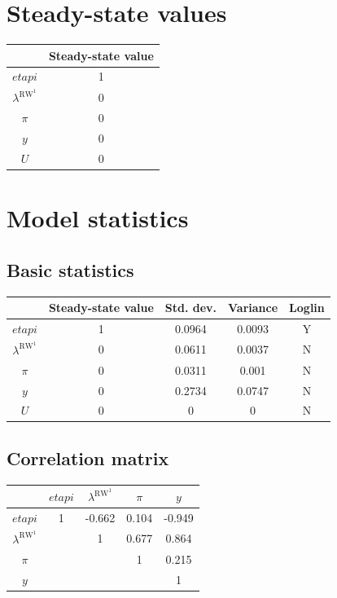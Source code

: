 

\section{Steady-state values}


\begin{tabular}{c|c|}
  & Steady-state value\\
\hline
${e\!t\!a\!p\!i}$ & 1 \\
$\lambda^{\mathrm{RW}^{\mathrm{1}}}$ & 0 \\
$\pi$ & 0 \\
$y$ & 0 \\
$U$ & 0 \\
\hline
\end{tabular}


\section{Model statistics}

\subsection{Basic statistics}

\begin{tabular}{c|c|c|c|c|}
  & Steady-state value & Std. dev. & Variance & Loglin\\
\hline
${e\!t\!a\!p\!i}$ & 1 & 0.0964 & 0.0093 & Y    \\
$\lambda^{\mathrm{RW}^{\mathrm{1}}}$ & 0 & 0.0611 & 0.0037 & N    \\
$\pi$ & 0 & 0.0311 & 0.001 & N    \\
$y$ & 0 & 0.2734 & 0.0747 & N    \\
$U$ & 0 & 0 & 0 & N    \\
\hline
\end{tabular}


\subsection{Correlation matrix}

\begin{tabular}{c|cccc|}
  & ${e\!t\!a\!p\!i}$ & $\lambda^{\mathrm{RW}^{\mathrm{1}}}$ & $\pi$ & $y$\\
\hline
${e\!t\!a\!p\!i}$ & 1 & -0.662 & 0.104 & -0.949 \\
$\lambda^{\mathrm{RW}^{\mathrm{1}}}$ &  & 1 & 0.677 & 0.864 \\
$\pi$ &  &  & 1 & 0.215 \\
$y$ &  &  &  & 1 \\
\hline
\end{tabular}


